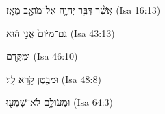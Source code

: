 
\begin{exe}

\ex\label{postdur_Isa_exs1}
\texthebrew{
אֲשֶׁ֨ר דִּבֶּ֧ר יְהוָ֛ה אֶל־מֹואָ֖ב מֵאָֽז׃ 
} (Isa 16:13)

\ex\label{postdur_Isa_exs2}
\texthebrew{
גַּם־מִיֹּום֙ אֲנִ֣י ה֔וּא 
} (Isa 43:13)

\ex\label{postdur_Isa_exs3}
\texthebrew{
וּמִקֶּ֖דֶם 
} (Isa 46:10)

\ex\label{postdur_Isa_exs4}
\texthebrew{
וּמִבֶּ֖טֶן קֹ֥רָא לָֽךְ׃ 
} (Isa 48:8)

\ex\label{postdur_Isa_exs5}
\texthebrew{
וּמֵעֹולָ֥ם לֹא־שָׁמְע֖וּ 
} (Isa 64:3)

\end{exe}
